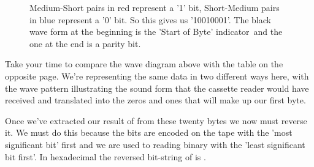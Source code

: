 \begin{figure}[H]
{
	\begin{adjustbox}{width=14cm,center}
    \end{adjustbox}
}\caption[]{Medium-Short pairs in red represent a '1' bit, Short-Medium pairs in blue represent a '0' bit. So this gives
us '10010001'. The black wave form at the beginning is the 'Start of Byte' indicator\, and the one at the end is a parity bit.}
\end{figure}

Take your time to compare the wave diagram above with the table on the opposite page. We're representing the same
data in two different ways here, with the wave pattern illustrating the sound form that the cassette reader would
have received and translated into the zeros and ones that will make up our first byte.

Once we've extracted our result of  from these twenty bytes we now must reverse it. We must do this because
the bits are encoded on the tape with the 'most significant bit' first and we are used to reading binary with the 'least significant bit
first'. In hexadecimal the reversed bit-string of  is .

